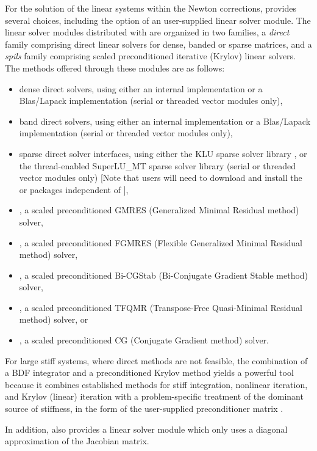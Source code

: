 For the solution of the linear systems within the Newton corrections, 
{\cvodes} provides several choices, including the option of an user-supplied
linear solver module. The linear solver modules distributed with {\sundials}
are organized in two families, a {\em direct} family comprising direct linear 
solvers for dense, banded or sparse matrices, and a {\em spils}
family comprising scaled preconditioned iterative (Krylov) linear
solvers. 
The methods offered through these modules are as follows:
\begin{itemize}
\item dense direct solvers, using either an internal implementation or 
  a Blas/Lapack implementation (serial or threaded vector modules only),
\item band direct solvers, using either an internal implementation or 
  a Blas/Lapack implementation (serial or threaded vector modules only),
\item sparse direct solver interfaces, using either the KLU sparse solver
  library \cite{DaPa:10,KLU_site}, or the thread-enabled SuperLU\_MT sparse
  solver library \cite{Li:05,DGL:99,SuperLUMT_site} (serial or threaded 
  vector modules only) [Note that users will need to download and install the 
  {\klu} or {\superlumt} packages independent of {\cvodes}],
\item {\spgmr}, a scaled preconditioned GMRES (Generalized Minimal Residual method)
  solver,
\item {\spfgmr}, a scaled preconditioned FGMRES (Flexible Generalized
  Minimal Residual method) solver,
\item {\spbcg}, a scaled preconditioned Bi-CGStab (Bi-Conjugate Gradient Stable
  method) solver,
\item {\sptfqmr}, a scaled preconditioned TFQMR (Transpose-Free Quasi-Minimal
  Residual method) solver, or
\item {\pcg}, a scaled preconditioned CG (Conjugate Gradient method) solver.
\end{itemize}
For large stiff systems, where direct methods are not feasible, the
combination of a BDF integrator and a preconditioned Krylov
method yields a powerful tool
because it combines established methods for stiff integration,
nonlinear iteration, and Krylov (linear) iteration with a
problem-specific treatment of the dominant source of stiffness, in the
form of the user-supplied preconditioner matrix \cite{BrHi:89}.

In addition, {\cvode} also provides a linear solver module which only uses
a diagonal approximation of the Jacobian matrix. 

